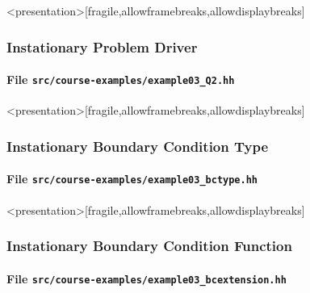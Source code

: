 \begin{frame}<presentation>[fragile,allowframebreaks,allowdisplaybreaks]
\frametitle<presentation>{Instationary Problem Driver}
\framesubtitle<presentation>{File \texttt{src/course-examples/example03\_Q2.hh}}

\end{frame}

\begin{frame}<presentation>[fragile,allowframebreaks,allowdisplaybreaks]
\frametitle<presentation>{Instationary Boundary Condition Type}
\framesubtitle<presentation>{File \texttt{src/course-examples/example03\_bctype.hh}}

\end{frame}

\begin{frame}<presentation>[fragile,allowframebreaks,allowdisplaybreaks]
\frametitle<presentation>{Instationary Boundary Condition Function}
\framesubtitle<presentation>{File \texttt{src/course-examples/example03\_bcextension.hh}}

\end{frame}


